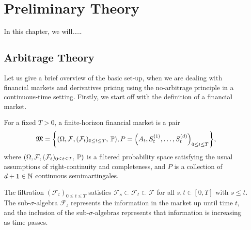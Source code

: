 \chapter{Preliminary Theory}
In this chapter, we will.....

\section{Arbitrage Theory}
Let us give a brief overview of the basic set-up, when we are dealing with financial markets and derivatives pricing using the no-arbitrage principle in a continuous-time setting. Firstly, we start off with the definition of a financial market.
\begin{defn}
    For a fixed $T>0$, a finite-horizon financial market is a pair
    \begin{equation}
        \mathfrak{M}=\left\{\left(\Omega,\mathcal{F},(\mathcal{F}_{t})_{0\leq t\leq T},\hspace{2 pt}\mathbb{P}\right), P=\left(A_{t},S_{t}^{(1)},\dots,S_{t}^{(d)}\right)_{0\leq t\leq T}\right\},
    \end{equation}
    where $(\Omega,\mathcal{F},(\mathcal{F}_{t})_{0\leq t\leq T},\hspace{2 pt}\mathbb{P})$ is a filtered probability space satisfying the usual assumptions of right-continuity and completeness, and $P$ is a collection of $d+1\in\mathbb{N}$ continuous semimartingales.
\end{defn}
The filtration $(\mathcal{F}_{t})_{0\leq t\leq T}$ satisfies $\mathcal{F}_{s}\subset \mathcal{F}_{t}\subset \mathcal{F}$ for all $s,t\in [0,T]$ with $s\leq t$. The sub-$\sigma$-algebra $\mathcal{F}_{t}$ represents the information in the market up until time $t$, and the inclusion of the sub-$\sigma$-algebras represents that information is increasing as time passes.

